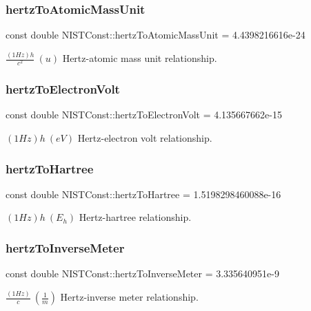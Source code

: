 \subsubsection{\texorpdfstring{hertz\+To\+Atomic\+Mass\+Unit}{hertzToAtomicMassUnit}}
{\footnotesize\ttfamily const double N\+I\+S\+T\+Const\+::hertz\+To\+Atomic\+Mass\+Unit = 4.\+4398216616e-\/24}

$\frac{(1 Hz)h}{c^2} \ (u)$ Hertz-\/atomic mass unit relationship. \mbox{\label{group___hertz_ga035f43de5d8ad8208675c53a0057d14d}} 
\subsubsection{\texorpdfstring{hertz\+To\+Electron\+Volt}{hertzToElectronVolt}}
{\footnotesize\ttfamily const double N\+I\+S\+T\+Const\+::hertz\+To\+Electron\+Volt = 4.\+135667662e-\/15}

$(1 Hz)h \ (eV)$ Hertz-\/electron volt relationship. \mbox{\label{group___hertz_ga2ededb8b750b44cde6d83c1c07b6a870}} 
\subsubsection{\texorpdfstring{hertz\+To\+Hartree}{hertzToHartree}}
{\footnotesize\ttfamily const double N\+I\+S\+T\+Const\+::hertz\+To\+Hartree = 1.\+5198298460088e-\/16}

$(1 Hz)h \ (E_h)$ Hertz-\/hartree relationship. \mbox{\label{group___hertz_ga6d5ccd7fed8ad7f2abb5c368565a1666}} 
\subsubsection{\texorpdfstring{hertz\+To\+Inverse\+Meter}{hertzToInverseMeter}}
{\footnotesize\ttfamily const double N\+I\+S\+T\+Const\+::hertz\+To\+Inverse\+Meter = 3.\+335640951e-\/9}

$\frac{(1 Hz)}{c} \ (\frac{1}{m})$ Hertz-\/inverse meter relationship. \mbox{\label{group___hertz_ga827c4e99287fcd5363fabcfe1381cc37}} 
